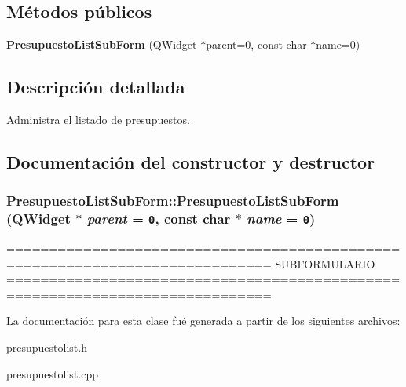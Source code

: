 \subsection*{M\'{e}todos p\'{u}blicos}
\begin{CompactItemize}
\item 
{\bf Presupuesto\-List\-Sub\-Form} (QWidget $\ast$parent=0, const char $\ast$name=0)
\end{CompactItemize}


\subsection{Descripci\'{o}n detallada}
Administra el listado de presupuestos. 



\subsection{Documentaci\'{o}n del constructor y destructor}
\subsubsection{\setlength{\rightskip}{0pt plus 5cm}Presupuesto\-List\-Sub\-Form::Presupuesto\-List\-Sub\-Form (QWidget $\ast$ {\em parent} = {\tt 0}, const char $\ast$ {\em name} = {\tt 0})}\label{classPresupuestoListSubForm_a0}


============================================================================= SUBFORMULARIO ============================================================================= 

La documentaci\'{o}n para esta clase fu\'{e} generada a partir de los siguientes archivos:\begin{CompactItemize}
\item 
presupuestolist.h\item 
presupuestolist.cpp\end{CompactItemize}
